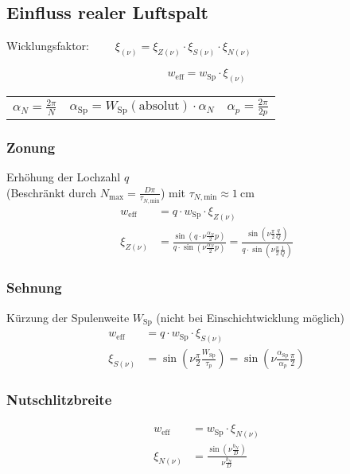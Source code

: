 \begin{sectionbox}
\subsection{Einfluss realer Luftspalt}
\begin{symbolbox}
  Wicklungsfaktor: $\qquad\xi_{(\nu)} = \xi_{Z(\nu)}\cdot\xi_{S(\nu)}\cdot\xi_{N(\nu)}$
\end{symbolbox}
\[w_\text{eff} = w_\text{Sp}\cdot\xi_{(\nu)}\]
\begin{tabularx}{\columnwidth}{cCc}
$\alpha_N = \frac{2\pi}{N}$ & $\alpha_\text{Sp} = W_\text{Sp}(\text{absolut})\cdot\alpha_N$ & $\alpha_p = \frac{2\pi}{2p}$
\end{tabularx}

\subsubsection{Zonung}
Erhöhung der Lochzahl $q$\\
(Beschränkt durch $N_\text{max} = \frac{D\pi}{\tau_{N,\text{min}}}$) mit $\tau_{N,\text{min}} \approx \SI{1}{\centi\meter}$
\begin{align*}
w_\text{eff} &= q\cdot w_\text{Sp}\cdot\xi_{Z(\nu)}\\
\xi_{Z(\nu)} &= \frac{\sin\left(q\cdot\nu\frac{\alpha_N}{2}p\right)}{q\cdot\sin\left(\nu\frac{\alpha_N}{2}p\right)} = \frac{\sin\left(\nu\frac{\pi}{2}\frac{q}{Q}\right)}{q\cdot\sin\left(\nu\frac{\pi}{2}\frac{1}{Q}\right)}
\end{align*}

\subsubsection{Sehnung}
Kürzung der Spulenweite $W_\text{Sp}$ (nicht bei Einschichtwicklung möglich)\\
\begin{align*}
w_\text{eff} &= q\cdot w_\text{Sp}\cdot\xi_{S(\nu)}\\
\xi_{S(\nu)} &= \sin\left(\nu\frac{\pi}{2}\frac{W_\text{Sp}}{\tau_p}\right) = \sin\left(\nu\frac{\alpha_\text{Sp}}{\alpha_p}\frac{\pi}{2}\right)
\end{align*}

\subsubsection{Nutschlitzbreite}
\begin{align*}
w_\text{eff} &= w_\text{Sp}\cdot\xi_{N(\nu)}\\
\xi_{N(\nu)} &= \frac{\sin\left(\nu\frac{b_N}{D}\right)}{\nu\frac{b_N}{D}}
\end{align*}
\end{sectionbox}
